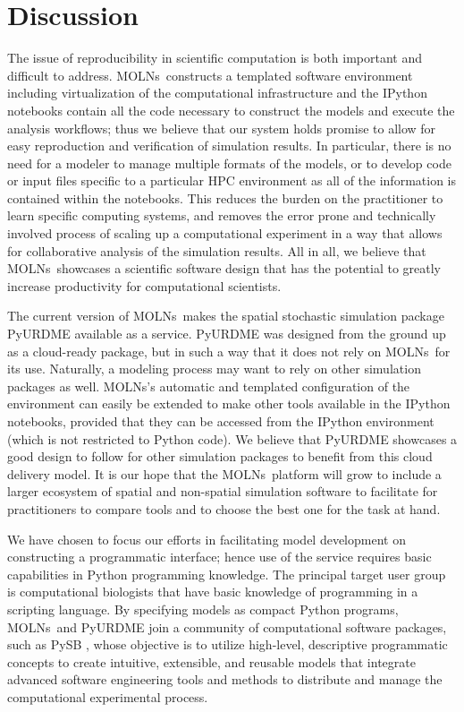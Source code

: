 \documentclass[final,leqno,onefignum,onetabnum]{siamltex1213}
\def\packagename {MOLNs}
\begin{document}
\section{Discussion}
\label{sec:Discussion}

The issue of reproducibility in scientific computation is both important and difficult to address. \packagename~constructs a templated software environment including virtualization of the computational infrastructure and the IPython notebooks contain all the code necessary to construct the models and execute the analysis workflows; thus we believe that our system holds promise to allow for easy reproduction and verification of simulation results. In particular, there is no need for a modeler to manage multiple formats of the models, or to develop code or input files specific to a particular HPC environment as all of the information is contained within the notebooks. This reduces the burden on the practitioner to learn specific computing systems, and removes the error prone and technically involved process of scaling up a computational experiment in a way that allows for collaborative analysis of the simulation results. All in all, we believe that \packagename~showcases a scientific software design that has the potential to greatly increase productivity for computational scientists.        

The current version of \packagename~makes the spatial stochastic simulation package PyURDME available as a service. PyURDME was designed from the ground up as a cloud-ready package, but in such a way that it does not rely on \packagename~for its use.  Naturally, a modeling process may want to rely on other simulation packages as well. \packagename's automatic and templated configuration of the environment can easily be extended to make other tools available in the IPython notebooks, provided that they can be accessed from the IPython environment (which is not restricted to Python code). We believe that PyURDME showcases a good design to follow for other simulation packages to benefit from this cloud delivery model. It is our hope that the \packagename~platform will grow to include a larger ecosystem of spatial and non-spatial simulation software to facilitate for practitioners to compare tools and to choose the best one for the task at hand.

We have chosen to focus our efforts in facilitating model development on constructing a programmatic interface; hence use of the service requires basic capabilities in Python programming knowledge.  The principal target user group is computational biologists that have basic knowledge of programming in a scripting language. 
By specifying models as compact Python programs, \packagename~and PyURDME join a community of computational software packages, such as PySB \cite{pysb},
whose objective is to utilize high-level, descriptive programmatic concepts to create intuitive, extensible, and reusable models that integrate advanced software engineering tools and methods to distribute and manage the computational experimental process.
\end{document}
